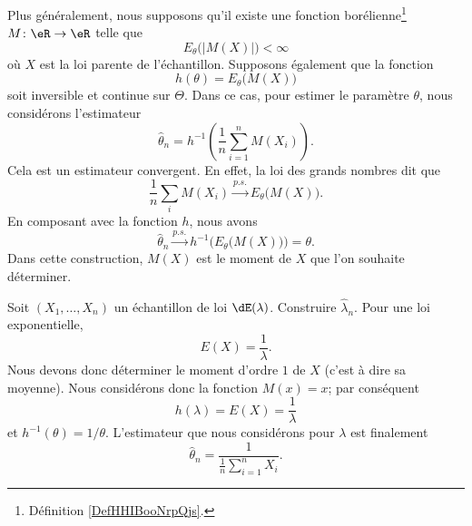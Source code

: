 Plus généralement, nous supposons qu'il existe une fonction borélienne\footnote{Définition \ref{DefHHIBooNrpQjs}.} \( M\colon \eR\to \eR\) telle que
\begin{equation}
    E_{\theta}\big( | M(X) | \big)<\infty
\end{equation}
où \( X\) est la loi parente de l'échantillon. Supposons également que la fonction 
\begin{equation}
    h(\theta)=E_{\theta}\big( M(X) \big)
\end{equation}
soit inversible et continue sur \( \Theta\). Dans ce cas, pour estimer le paramètre \( \theta\), nous considérons l'estimateur
\begin{equation}
    \hat\theta_n=h^{-1}\left( \frac{1}{ n }\sum_{i=1}^nM(X_i) \right).
\end{equation}
Cela est un estimateur convergent. En effet, la loi des grands nombres dit que
\begin{equation}
    \frac{1}{ n }\sum_iM(X_i)\stackrel{p.s.}{\longrightarrow}E_{\theta}\big( M(X) \big).
\end{equation}
En composant avec la fonction \( h\), nous avons
\begin{equation}
    \hat\theta_n\stackrel{p.s.}{\longrightarrow}h^{-1}\Big( E_{\theta}\big( M(X) \big) \Big)=\theta.
\end{equation}
Dans cette construction, \( M(X)\) est le moment de \( X\) que l'on souhaite déterminer.

\begin{example}
    Soit \( (X_1,\ldots,X_n)\) un échantillon de loi \( \dE(\lambda)\). Construire \( \hat\lambda_n\). Pour une loi exponentielle,
    \begin{equation}
        E(X)=\frac{1}{ \lambda }.
    \end{equation}
    Nous devons donc déterminer le moment d'ordre \( 1\) de \( X\) (c'est à dire sa moyenne). Nous considérons donc la fonction \( M(x)=x\); par conséquent
    \begin{equation}
        h(\lambda)=E(X)=\frac{1}{ \lambda }
    \end{equation}
    et \( h^{-1}(\theta)=1/\theta\). L'estimateur que nous considérons pour \( \lambda\) est finalement
    \begin{equation}
        \hat\theta_n=\frac{1}{ \frac{1}{ n }\sum_{i=1}^nX_i }.
    \end{equation}
\end{example}

